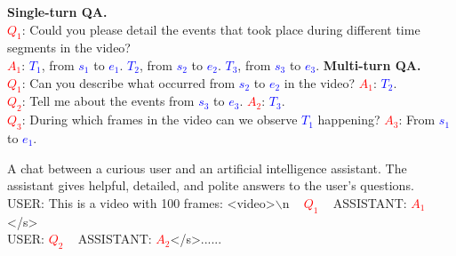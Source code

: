 \documentclass[10pt,twocolumn,letterpaper]{article}
\begin{document}
\begin{figure*}[t] 
\centering
\begin{tcolorbox}[colback=gray!20, colframe=black, text width=0.8\textwidth, title={\small Box 1: Examples of both single-turn and multi-turn QA for a video containing three events.}, fontupper=\small, fontlower=\small]
\hypertarget{box1}{}

\textbf{Single-turn QA.} \\
\textcolor{red}{$Q_1$}: Could you please detail the events that took place during different time segments in the video? \\
\textcolor{red}{$A_1$}: \textcolor{blue}{$T_1$}, from \textcolor{blue}{$s_1$} to \textcolor{blue}{$e_1$}. \textcolor{blue}{$T_2$}, from \textcolor{blue}{$s_2$} to \textcolor{blue}{$e_2$}. \textcolor{blue}{$T_3$}, from \textcolor{blue}{$s_3$} to \textcolor{blue}{$e_3$}. 
\tcblower
\textbf{Multi-turn QA.} \\
\textcolor{red}{$Q_1$}: Can you describe what occurred from \textcolor{blue}{$s_2$} to \textcolor{blue}{$e_2$} in the video? \textcolor{red}{$A_1$}: \textcolor{blue}{$T_2$}. \\
\textcolor{red}{$Q_2$}: Tell me about the events from \textcolor{blue}{$s_3$} to \textcolor{blue}{$e_3$}. \textcolor{red}{$A_2$}: \textcolor{blue}{$T_3$}. \\
\textcolor{red}{$Q_3$}: During which frames in the video can we observe \textcolor{blue}{$T_1$} happening? \textcolor{red}{$A_3$}: From \textcolor{blue}{$s_1$} to \textcolor{blue}{$e_1$}.
\end{tcolorbox}
\end{figure*}




\begin{figure*}[t] 
\centering
\begin{tcolorbox}[colback=gray!20, colframe=black, text width=0.8\textwidth, center, title={\small Box 2: The inputs to VTimeLLM in Stage 2 and Stage 3}, fontupper=\small, fontlower=\small]
\hypertarget{box2}{}
A chat between a curious user and an artificial intelligence assistant. The assistant gives helpful, detailed, and polite answers to the user's questions. \\
USER: This is a video with 100 frames: \textless video\textgreater $\backslash$n ~ \textcolor{red}{$Q_1$} ~ ASSISTANT: \textcolor{red}{$A_1$}\textless /s\textgreater \\
USER: \textcolor{red}{$Q_2$} ~ ASSISTANT: \textcolor{red}{$A_2$}\textless /s\textgreater ......
\end{tcolorbox}
\end{figure*}
\end{document}
